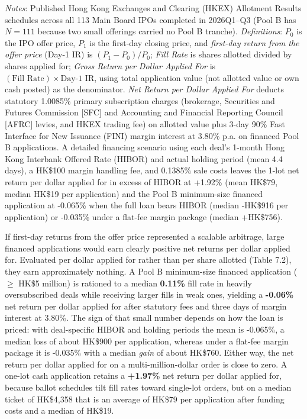 \documentclass[11pt,letterpaper]{article}
\begin{document}
\begin{table}[!htbp]
\par\vspace{3pt}\noindent\parbox{\textwidth}{\scriptsize\raggedright \textit{Notes}: Published Hong Kong Exchanges and Clearing (HKEX) Allotment Results schedules across all 113 Main Board IPOs completed in 2026Q1–Q3 (Pool B has $N = 111$ because two small offerings carried no Pool B tranche). \textit{Definitions}: $P_0$ is the IPO offer price, $P_1$ is the first-day closing price, and \textit{first-day return from the offer price} (Day-1 IR) is $(P_1 - P_0)/P_0$; \textit{Fill Rate} is shares allotted divided by shares applied for; \textit{Gross Return per Dollar Applied For} is $(\text{Fill Rate}) \times \text{Day-1 IR}$, using total application value (not allotted value or own cash posted) as the denominator. \textit{Net Return per Dollar Applied For} deducts statutory 1.0085\% primary subscription charges (brokerage, Securities and Futures Commission [SFC] and Accounting and Financial Reporting Council [AFRC] levies, and HKEX trading fee) on allotted value plus 3-day 90\% Fast Interface for New Issuance (FINI) margin interest at 3.80\% p.a. on financed Pool B applications. A detailed financing scenario using each deal's 1-month Hong Kong Interbank Offered Rate (HIBOR) and actual holding period (mean 4.4 days), a HK\$100 margin handling fee, and 0.1385\% sale costs leaves the 1-lot net return per dollar applied for in excess of HIBOR at +1.92\% (mean HK\$79, median HK\$19 per application) and the Pool B minimum-size financed application at -0.065\% when the full loan bears HIBOR (median -HK\$916 per application) or -0.035\% under a flat-fee margin package (median +HK\$756).}
\end{table}

If first-day returns from the offer price represented a scalable arbitrage, large financed applications would earn clearly positive net returns per dollar applied for. Evaluated per dollar applied for rather than per share allotted (Table 7.2), they earn approximately nothing. A Pool B minimum-size financed application ($\ge$ HK\$5 million) is rationed to a median \textbf{0.11\%} fill rate in heavily oversubscribed deals while receiving larger fills in weak ones, yielding a \textbf{-0.06\%} net return per dollar applied for after statutory fees and three days of margin interest at 3.80\%. The sign of that small number depends on how the loan is priced: with deal-specific HIBOR and holding periods the mean is -0.065\%, a median loss of about HK\$900 per application, whereas under a flat-fee margin package it is -0.035\% with a median \textit{gain} of about HK\$760. Either way, the net return per dollar applied for on a multi-million-dollar order is close to zero. A one-lot cash application retains a \textbf{+1.97\%} net return per dollar applied for, because ballot schedules tilt fill rates toward single-lot orders, but on a median ticket of HK\$4,358 that is an average of HK\$79 per application after funding costs and a median of HK\$19.
\end{document}

